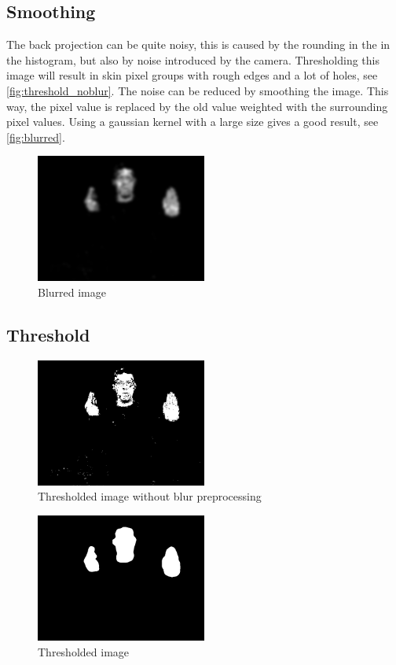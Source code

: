 \subsection*{Smoothing}
The back projection can be quite noisy, this is caused by the rounding in the in the histogram, but also by noise introduced by the camera. Thresholding this image will result in skin pixel groups with rough edges and a lot of holes, see \autoref{fig:threshold_noblur}. The noise can be reduced by smoothing the image. This way, the pixel value is replaced by the old value weighted with the surrounding pixel values. Using a gaussian kernel with a large size gives a good result, see \autoref{fig:blurred}.

\begin{figure}[htbp]
    \center{}
    \includegraphics[width=0.5\textwidth]{figures/pipeline/blurred.jpg}
	\caption{Blurred image}
	\label{fig:blurred}
\end{figure}


\subsection*{Threshold}

\begin{figure}[htbp]
    \center{}
 \includegraphics[width=0.5\textwidth]{figures/pipeline/thresholded_noblur.jpg}
	\caption{Thresholded image without blur preprocessing}
	\label{fig:threshold_noblur}
\end{figure}

\begin{figure}[htbp]
    \center{}
    \includegraphics[width=0.5\textwidth]{figures/pipeline/thresholded.jpg}
	\caption{Thresholded image}
	\label{fig:threshold}
\end{figure}


